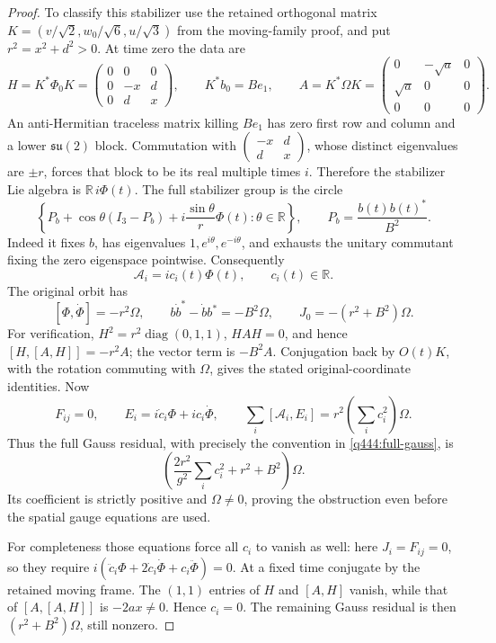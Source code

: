 \begin{proof}
To classify this stabilizer use the retained orthogonal matrix
$K=(v/\sqrt2,w_0/\sqrt6,u/\sqrt3)$ from the moving-family proof, and
put $r^2=x^2+d^2>0$. At time zero the data are
\[
 H=K^*\Phi_0K=\begin{pmatrix}0&0&0\\0&-x&d\\0&d&x\end{pmatrix},
 \qquad K^*b_0=Be_1,\qquad
 A=K^*\Omega K=
 \begin{pmatrix}0&-\sqrt a&0\\\sqrt a&0&0\\0&0&0\end{pmatrix}.
\]
An anti-Hermitian traceless matrix killing $Be_1$ has zero first row
and column and a lower $\mathfrak{su}(2)$ block. Commutation with
$\left(\begin{smallmatrix}-x&d\\d&x\end{smallmatrix}\right)$, whose
distinct eigenvalues are $\pm r$, forces that block to be its real
multiple times $i$. Therefore the stabilizer Lie algebra is
$\mathbb R\,i\Phi(t)$. The full stabilizer group is the circle
\[
 \left\{P_b+\cos\theta(I_3-P_b)
          +i\frac{\sin\theta}{r}\Phi(t):\theta\in\mathbb R\right\},
 \qquad P_b=\frac{b(t)b(t)^*}{B^2}.
\]
Indeed it fixes $b$, has eigenvalues $1,e^{i\theta},e^{-i\theta}$,
and exhausts the unitary commutant fixing the zero eigenspace pointwise.
Consequently
\[
 \mathcal A_i=i c_i(t)\Phi(t),\qquad c_i(t)\in\mathbb R.
\]
The original orbit has
\[
 [\Phi,\dot\Phi]=-r^2\Omega,\qquad
 b\dot b^*-\dot b b^*=-B^2\Omega,\qquad
 J_0=-(r^2+B^2)\Omega.
\]
For verification, $H^2=r^2\operatorname{diag}(0,1,1)$,
$HAH=0$, and hence $[H,[A,H]]=-r^2A$; the vector term
is $-B^2A$. Conjugation back by $O(t)K$, with the rotation commuting
with $\Omega$, gives the stated original-coordinate identities.
Now
\[
 F_{ij}=0,\qquad
 E_i=i\dot c_i\Phi+i c_i\dot\Phi,\qquad
 \sum_i[\mathcal A_i,E_i]
          =r^2\left(\sum_i c_i^2\right)\Omega.
\]
Thus the full Gauss residual, with precisely the convention in
\eqref{q444:full-gauss}, is
\[
 \boxed{\left(\frac{2r^2}{g^2}\sum_i c_i^2+r^2+B^2\right)\Omega.}
\]
Its coefficient is strictly positive and $\Omega\neq0$, proving the
obstruction even before the spatial gauge equations are used.

For completeness those equations force all $c_i$ to vanish as well:
here $J_i=F_{ij}=0$, so they require
$i(\ddot c_i\Phi+2\dot c_i\dot\Phi+c_i\ddot\Phi)=0$.
At a fixed time conjugate by the retained moving frame. The $(1,1)$
entries of $H$ and $[A,H]$ vanish, while that of $[A,[A,H]]$ is
$-2ax\neq0$. Hence $c_i=0$. The remaining Gauss residual is then
$(r^2+B^2)\Omega$, still nonzero.
\end{proof}

